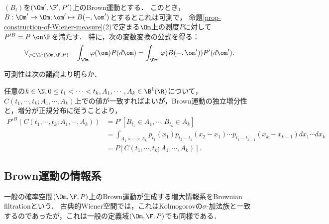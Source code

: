 \documentclass[uplatex,dvipdfmx]{jsreport}
\begin{document}
\begin{lemma}[Wiener測度の特徴付け]
    $(B_t)$を$(\Om',\F',P')$上のBrown運動とする．
    このとき，$B:\Om'\to\Om;\om'\mapsto B(-,\om')$とするとこれは可測で，
    命題\ref{prop-construction-of-Wiener-measure}(2)で定まる$\Om$上の測度$P$に対して$P'^B=P\;\on\F$を満たす．
    特に，次の変数変換の公式を得る：
    \[\forall_{\varphi\in\L^1(\Om,\F,P)}\quad\int_\Om\varphi(\om)P(d\om)=\int_{\Om'}\varphi(B(-,\om'))P'(d\om').\]
\end{lemma}
\begin{Proof}
    可測性は次の議論より明らか．

    任意の$k\in\N,0\le t_1<\cdots<t_k,A_1,\cdots,A_k\in\B^1(\R)$について，$C(t_1,\cdots,t_k;A_1,\cdots,A_k)$上での値が一致すればよいが，Brown運動の独立増分性と，増分が正規分布に従うことより，
    \begin{align*}
        P'^B(C(t_1,\cdots,t_k;A_1,\cdots,A_k))&=P'[B_{t_1}\in A_1,\cdots,B_{t_k}\in A_k]\\
        &=\int_{A_1\times\cdots\times A_k}p_{t_1}(x_1)p_{t_2-t_1}(x_2-x_1)\cdots p_{t_k-t_{k-1}}(x_k-x_{k-1})dx_1\cdots dx_k\\
        &=P[C(t_1,\cdots,t_k;A_1,\cdots,A_k)].
    \end{align*}
\end{Proof}

\subsection{Brown運動の情報系}

\begin{tcolorbox}[colframe=ForestGreen, colback=ForestGreen!10!white,breakable,colbacktitle=ForestGreen!40!white,coltitle=black,fonttitle=\bfseries\sffamily,
title=]
    一般の確率空間$(\Om,\F,P)$上のBrown運動が生成する増大情報系をBrownian filtrationという．
    古典的Wiener空間では，これはKolmogorovの$\sigma$-加法族と一致するのであったが，これは一般の定義域$(\Om,\F,P)$でも同様である．
\end{tcolorbox}
\end{document}
